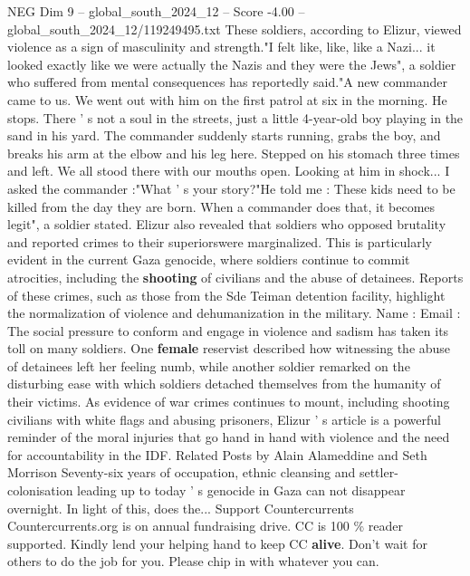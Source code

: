 \begin{textsample}{NEG Dim 9 – global\_south\_2024\_12 – Score -4.00 – global\_south\_2024\_12/119249495.txt}
These soldiers, according to Elizur, viewed violence as a sign of masculinity and strength."I felt like, like, like a Nazi... it looked exactly like we were actually the Nazis and they were the Jews", a soldier who suffered from mental consequences has reportedly said."A new commander came to us.
We went out with him on the first patrol at six in the morning.
He stops.
There ' s not a soul in the streets, just a little 4-year-old boy playing in the sand in his yard.
The commander suddenly starts running, grabs the boy, and breaks his arm at the elbow and his leg here.
Stepped on his stomach three times and left.
We all stood there with our mouths open.
Looking at him in shock...
I asked the commander :"What ' s your story?"He told me : These kids need to be killed from the day they are born.
When a commander does that, it becomes legit", a soldier stated.
Elizur also revealed that soldiers who opposed brutality and reported crimes to their superiorswere marginalized.
This is particularly evident in the current Gaza genocide, where soldiers continue to commit atrocities, including the \textbf{shooting} of civilians and the abuse of detainees.
Reports of these crimes, such as those from the Sde Teiman detention facility, highlight the normalization of violence and dehumanization in the military.
Name : Email : The social pressure to conform and engage in violence and sadism has taken its toll on many soldiers.
One \textbf{female} reservist described how witnessing the abuse of detainees left her feeling numb, while another soldier remarked on the disturbing ease with which soldiers detached themselves from the humanity of their victims.
As evidence of war crimes continues to mount, including shooting civilians with white flags and abusing prisoners, Elizur ' s article is a powerful reminder of the moral injuries that go hand in hand with violence and the need for accountability in the IDF.
Related Posts by Alain Alameddine and Seth Morrison Seventy-six years of occupation, ethnic cleansing and settler-colonisation leading up to today ' s genocide in Gaza can not disappear overnight.
In light of this, does the...
Support Countercurrents Countercurrents.org is on annual fundraising drive.
CC is 100 \% reader supported.
Kindly lend your helping hand to keep CC \textbf{alive}.
Don't wait for others to do the job for you.
Please chip in with whatever you can.

\end{textsample}
